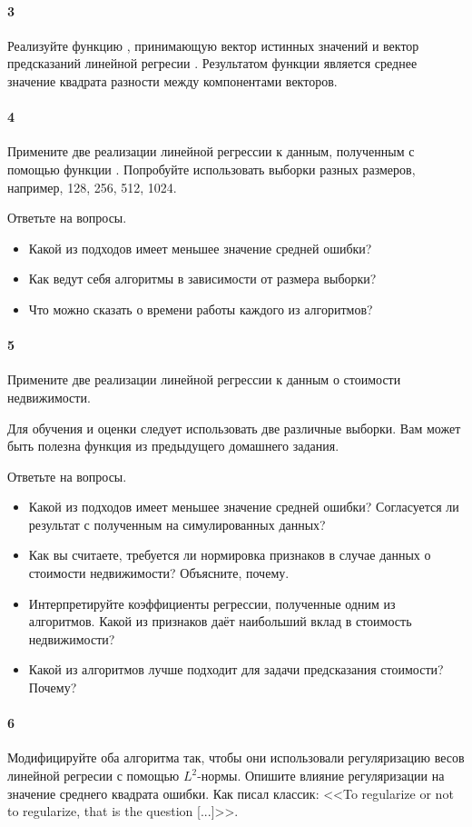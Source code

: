 \documentclass[a4paper,12pt]{article}
\begin{document}
\paragraph{3} Реализуйте функцию , принимающую вектор истинных
значений  и вектор предсказаний линейной регресии
. Результатом функции является среднее значение квадрата
разности между компонентами векторов.

\paragraph{4} Примените две реализации линейной регрессии к данным, полученным
с помощью функции . Попробуйте использовать выборки разных
размеров, например, 128, 256, 512, 1024.

Ответьте на вопросы.
\begin{itemize}
\item Какой из подходов имеет меньшее значение средней ошибки?
\item Как ведут себя алгоритмы в зависимости от размера выборки?
\item Что можно сказать о времени работы каждого из алгоритмов?
\end{itemize}

\paragraph{5} Примените две реализации линейной регрессии к данным о стоимости
недвижимости.

Для обучения и оценки следует использовать две различные выборки. Вам может
быть полезна функция  из предыдущего домашнего
задания.

Ответьте на вопросы.
\begin{itemize}
\item Какой из подходов имеет меньшее значение средней ошибки? Согласуется ли
  результат с полученным на симулированных данных?
\item Как вы считаете, требуется ли нормировка признаков в случае данных о
  стоимости недвижимости? Объясните, почему.
\item Интерпретируйте коэффициенты регрессии, полученные одним из
  алгоритмов. Какой из признаков даёт наибольший вклад в стоимость недвижимости?
\item Какой из алгоритмов лучше подходит для задачи предсказания стоимости?
  Почему?
\end{itemize}

\paragraph{6} Модифицируйте оба алгоритма так, чтобы они использовали
регуляризацию весов линейной регресии с помощью $L^2$-нормы. Опишите влияние
регуляризации на значение среднего квадрата ошибки. Как писал классик: <<To
regularize or not to regularize, that is the question [...]>>.
\end{document}
